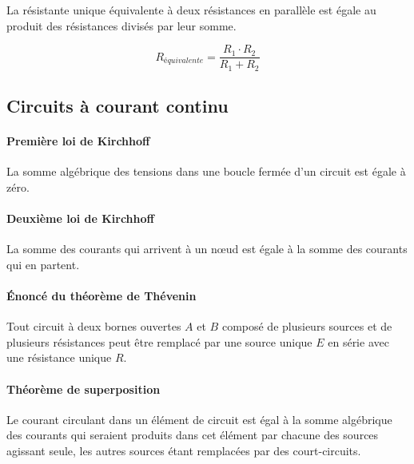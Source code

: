 \documentclass[]{article}
\let\oldparagraph\paragraph
\renewcommand{\paragraph}[1]{\oldparagraph{#1}\mbox{}}
\begin{document}
La résistante unique équivalente à deux résistances en parallèle est égale au produit des résistances divisés par leur somme.

$$ R_{équivalente} = \dfrac{R_1 \cdot R_2}{R_1 + R_2} $$


\subsection{Circuits à courant continu}\label{circuit-courant-continu}


\paragraph{Première loi de Kirchhoff}\label{1re-loi-kirchhoff}

La somme algébrique des tensions dans une boucle fermée d’un circuit est égale à zéro.


\paragraph{Deuxième loi de Kirchhoff}\label{2e-loi-kirchhoff}

La somme des courants qui arrivent à un nœud est égale à la somme des courants qui en partent.


\paragraph{Énoncé du théorème de Thévenin}

Tout circuit à deux bornes ouvertes $A$ et $B$ composé de plusieurs sources et de plusieurs résistances peut être remplacé par une source unique $E$ en série avec une résistance unique $R$.

\paragraph{Théorème de superposition}

Le courant circulant dans un élément de circuit est égal à la somme algébrique des courants qui seraient produits dans cet élément par chacune des sources agissant seule, les autres sources étant remplacées par des court-circuits.
\end{document}
